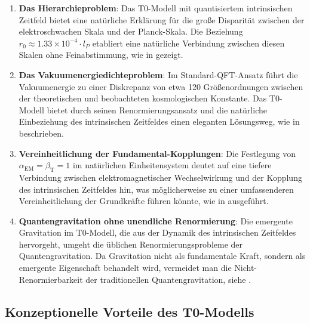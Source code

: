 \documentclass[12pt,a4paper]{article}
\newcommand{\alphaEM}{\alpha_{\text{EM}}}
\newcommand{\betaT}{\beta_{\text{T}}}
\begin{document}
	\begin{enumerate}
		\item \textbf{Das Hierarchieproblem}: Das T0-Modell mit quantisiertem intrinsischen Zeitfeld bietet eine natürliche Erklärung für die große Disparität zwischen der elektroschwachen Skala und der Planck-Skala. Die Beziehung $r_0 \approx 1.33 \times 10^{-4} \cdot l_P$ etabliert eine natürliche Verbindung zwischen diesen Skalen ohne Feinabstimmung, wie in \cite{pascher_params_2025} gezeigt.
		
		\item \textbf{Das Vakuumenergiedichteproblem}: Im Standard-QFT-Ansatz führt die Vakuumenergie zu einer Diskrepanz von etwa 120 Größenordnungen zwischen der theoretischen und beobachteten kosmologischen Konstante. Das T0-Modell bietet durch seinen Renormierungsansatz und die natürliche Einbeziehung des intrinsischen Zeitfeldes einen eleganten Lösungsweg, wie in \cite{pascher_temp_2025} beschrieben.
		
		\item \textbf{Vereinheitlichung der Fundamental-Kopplungen}: Die Festlegung von $\alphaEM = \betaT = 1$ im natürlichen Einheitensystem deutet auf eine tiefere Verbindung zwischen elektromagnetischer Wechselwirkung und der Kopplung des intrinsischen Zeitfeldes hin, was möglicherweise zu einer umfassenderen Vereinheitlichung der Grundkräfte führen könnte, wie in \cite{pascher_alphabeta_2025} ausgeführt.
		
		\item \textbf{Quantengravitation ohne unendliche Renormierung}: Die emergente Gravitation im T0-Modell, die aus der Dynamik des intrinsischen Zeitfeldes hervorgeht, umgeht die üblichen Renormierungsprobleme der Quantengravitation. Da Gravitation nicht als fundamentale Kraft, sondern als emergente Eigenschaft behandelt wird, vermeidet man die Nicht-Renormierbarkeit der traditionellen Quantengravitation, siehe \cite{pascher_emergente_gravitation_2025}.
	\end{enumerate}
	
	\subsection{Konzeptionelle Vorteile des T0-Modells}
	\label{sec:konzeptionelle_vorteile}
	
\end{document}
